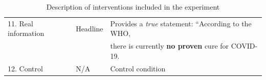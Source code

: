\documentclass[letterpaper, 12pt, parskip=full,DIV=10]{scrartcl}
\begin{document}
\begin{table}[H]
\begin{adjustbox}{max width = \textwidth}
\begin{tabular}{l|l|l}
11. Real information                                                                                                      & Headline                                                                                                     & Provides a \textit{true} statement: ``According to the WHO,\\ & & there is currently \textbf{no proven} cure for COVID-19.
 \\
12. Control                                                                                                        & N/A                                                                                                          & Control condition                                                                                                                                                                                                                                                                                                                                                                                              
\end{tabular}
\end{adjustbox}
\caption{Description of interventions included in the experiment}
\label{tab:treatments}
\end{table}
\end{document}

